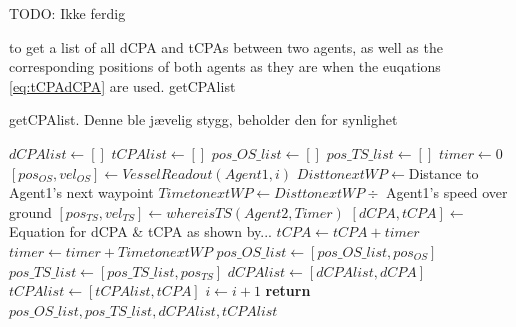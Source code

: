 
TODO: Ikke ferdig


to get a list of all dCPA and tCPAs between two agents, as well as the corresponding positions of both
agents as they are when the euqations \eqref{eq:tCPAdCPA} are used. getCPAlist 

\begin{algorithm}[t]
    \caption{getCPAlist. Denne ble jævelig stygg, beholder den for synlighet}\label{alg:getCPAlist}
    \begin{algorithmic}[1]
    \State $dCPAlist \gets []$
    \State $tCPAlist \gets []$
    \State $pos\_OS\_list \gets []$
    \State $pos\_TS\_list \gets []$
    \State $timer \gets 0$ 
        \State $[pos_{OS}, vel_{OS}] \gets VesselReadout(Agent1, i)$ 
        \State $DisttonextWP \gets $Distance to Agent1's next waypoint
        \State $TimetonextWP \gets DisttonextWP \div$ Agent1's speed over ground
        \State $[pos_{TS}, vel_{TS}] \gets whereisTS(Agent2, Timer)$ 
        \State $[dCPA, tCPA] \gets$ Equation for dCPA \& tCPA as shown by...
        \State $tCPA \gets tCPA + timer$ 
        \State $timer \gets timer + TimetonextWP$
        \State $pos\_OS\_list \gets [pos\_OS\_list, pos_{OS}]$ 
        \State $pos\_TS\_list \gets [pos\_TS\_list, pos_{TS}]$
        \State $dCPAlist \gets [dCPAlist, dCPA]$ 
        \State $tCPAlist \gets [tCPAlist, tCPA]$ 
        \State $i \gets i + 1$
    \EndFor
    \State \textbf{return} $pos\_OS\_list, pos\_TS\_list, dCPAlist, tCPAlist$
    \end{algorithmic}
\end{algorithm}

